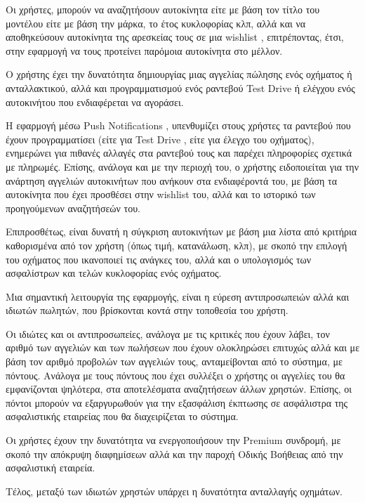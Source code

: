 \documentclass{../ol-softwaremanual}
\begin{document}
	Οι χρήστες, μπορούν να αναζητήσουν αυτοκίνητα είτε με βάση τον τίτλο του μοντέλου είτε με βάση την μάρκα, το έτος κυκλοφορίας κλπ, αλλά και να αποθηκεύσουν αυτοκίνητα της αρεσκείας τους σε μια \en wishlist \gr, επιτρέποντας, έτσι, στην εφαρμογή να τους προτείνει παρόμοια αυτοκίνητα στο μέλλον. \break 
	
	Ο χρήστης έχει την δυνατότητα δημιουργίας μιας αγγελίας πώλησης ενός οχήματος ή ανταλλακτικού, αλλά και προγραμματισμού ενός ραντεβού \en Test Drive \gr ή ελέγχου ενός αυτοκινήτου που ενδιαφέρεται να αγοράσει. \break
	
	Η εφαρμογή μέσω \en Push Notifications \gr, υπενθυμίζει στους χρήστες τα ραντεβού που έχουν προγραμματίσει (είτε για \en Test Drive \gr, είτε για έλεγχο του οχήματος), ενημερώνει για πιθανές αλλαγές στα ραντεβού τους και παρέχει πληροφορίες σχετικά με πληρωμές. Επίσης, ανάλογα και με την περιοχή του, ο χρήστης ειδοποιείται για την ανάρτηση αγγελιών αυτοκινήτων που ανήκουν στα ενδιαφέροντά του, με βάση τα αυτοκίνητα που έχει προσθέσει στην \en wishlist \gr του, αλλά και το ιστορικό των προηγούμενων αναζητήσεών του. \break
	
	Επιπροσθέτως, είναι δυνατή η σύγκριση αυτοκινήτων με βάση μια λίστα από κριτήρια καθορισμένα από τον χρήστη (όπως τιμή, κατανάλωση, κλπ), με σκοπό την επιλογή του οχήματος που ικανοποιεί τις ανάγκες του, αλλά και ο υπολογισμός των ασφαλίστρων και τελών κυκλοφορίας ενός οχήματος. \break
	
	Μια σημαντική λειτουργία της εφαρμογής, είναι η εύρεση αντιπροσωπειών αλλά και ιδιωτών πωλητών, που βρίσκονται κοντά στην τοποθεσία του χρήστη. \break
	
	Οι ιδιώτες και οι αντιπροσωπείες, ανάλογα με τις κριτικές που έχουν λάβει, τον αριθμό των αγγελιών και των πωλήσεων που έχουν ολοκληρώσει επιτυχώς αλλά και με βάση τον αριθμό προβολών των αγγελιών τους, ανταμείβονται από το σύστημα, με πόντους. Ανάλογα με τους πόντους που έχει συλλέξει ο χρήστης οι αγγελίες του θα εμφανίζονται ψηλότερα, στα αποτελέσματα αναζητήσεων άλλων χρηστών. Επίσης, οι πόντοι μπορούν να εξαργυρωθούν για την εξασφάλιση έκπτωσης σε ασφάλιστρα της ασφαλιστικής εταιρείας που θα διαχειρίζεται το σύστημα. \break
	
	Οι χρήστες έχουν την δυνατότητα να ενεργοποιήσουν την \en Premium \gr συνδρομή, με σκοπό την απόκρυψη διαφημίσεων αλλά και την παροχή Οδικής Βοήθειας από την ασφαλιστική εταιρεία. \break
	
	Τέλος, μεταξύ των ιδιωτών χρηστών υπάρχει η δυνατότητα ανταλλαγής οχημάτων. \break
	
\end{document}
